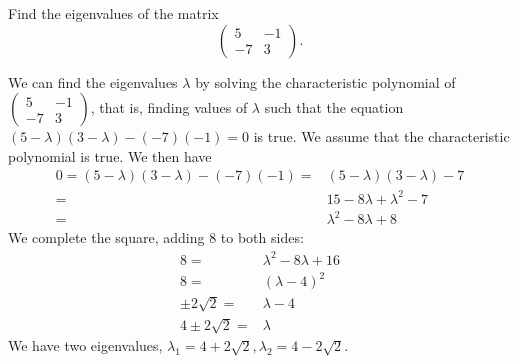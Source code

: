 \documentclass[12pt]{article}
\newenvironment{problem}[2][Problem]
{
	\begin{trivlist} 
		\item[\hskip \labelsep {\bfseries #1 #2:}]
	}
{
	\end{trivlist}
	}
\newenvironment{solution}[1][Solution]
{
	\begin{trivlist} 
		\item[\hskip \labelsep {\itshape #1:}]
	}
	{
	\end{trivlist}
}
\begin{document}
\begin{problem}{1}
Find the eigenvalues of the matrix
\[
\begin{pmatrix} 5&-1\\-7&3 \end{pmatrix} \text{.}
\]
\noindent
\newline
\newline
\begin{solution}
We can find the eigenvalues $\lambda$ by solving the characteristic polynomial of $\begin{pmatrix} 5&-1\\-7&3 \end{pmatrix}$, that is, finding values of $\lambda$ such that the equation $(5-\lambda)(3-\lambda) - (-7)(-1) = 0$ is true. We assume that the characteristic polynomial is true. We then have
\begin{align*}
0=(5-\lambda)(3-\lambda) - (-7)(-1)=& (5-\lambda)(3-\lambda) - 7\\
=& 15-8 \lambda + {\lambda}^2 -7\\
=& {\lambda}^2 -8 \lambda + 8
\end{align*}
We complete the square, adding 8 to both sides:
\begin{align}
8 =&  \lambda ^2 -8 \lambda + 16\\
8 =& (\lambda -4)^2\\
\pm 2 \sqrt{2} =& \lambda - 4\\
4 \pm 2 \sqrt{2} =& \lambda
\end{align}
We have two eigenvalues, $\lambda_{1} = 4 + 2\sqrt{2}, \lambda_{2} = 4 - 2\sqrt{2}$.
\end{solution}
\end{problem}
\end{document}
